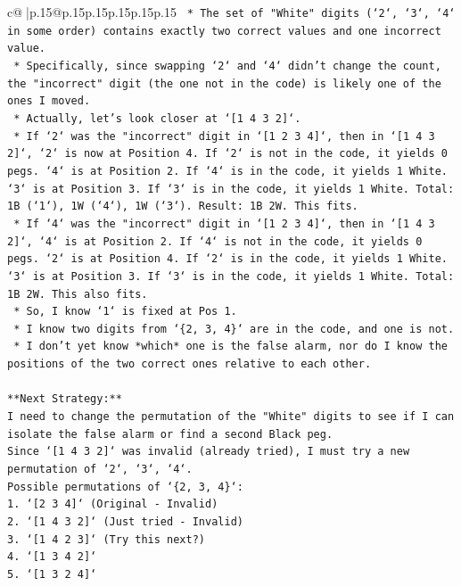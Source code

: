 \documentclass{article}
\begin{document}
{\begin{supertabular}{c@{$\;$}|p{.15\linewidth}@{}p{.15\linewidth}p{.15\linewidth}p{.15\linewidth}p{.15\linewidth}p{.15\linewidth}}
{{{\texttt{        *   The set of "White" digits (`2`, `3`, `4` in some order) contains exactly two correct values and one incorrect value.} \\
\texttt{        *   Specifically, since swapping `2` and `4` didn't change the count, the "incorrect" digit (the one not in the code) is likely one of the ones I moved.} \\
\texttt{    *   Actually, let's look closer at `{[}1 4 3 2{]}`.} \\
\texttt{        *   If `2` was the "incorrect" digit in `{[}1 2 3 4{]}`, then in `{[}1 4 3 2{]}`, `2` is now at Position 4. If `2` is not in the code, it yields 0 pegs. `4` is at Position 2. If `4` is in the code, it yields 1 White. `3` is at Position 3. If `3` is in the code, it yields 1 White. Total: 1B (`1`), 1W (`4`), 1W (`3`). Result: 1B 2W. This fits.} \\
\texttt{        *   If `4` was the "incorrect" digit in `{[}1 2 3 4{]}`, then in `{[}1 4 3 2{]}`, `4` is at Position 2. If `4` is not in the code, it yields 0 pegs. `2` is at Position 4. If `2` is in the code, it yields 1 White. `3` is at Position 3. If `3` is in the code, it yields 1 White. Total: 1B 2W. This also fits.} \\
\texttt{    *   So, I know `1` is fixed at Pos 1.} \\
\texttt{    *   I know two digits from `\{2, 3, 4\}` are in the code, and one is not.} \\
\texttt{    *   I don't yet know *which* one is the false alarm, nor do I know the positions of the two correct ones relative to each other.} \\
\\ 
\texttt{**Next Strategy:**} \\
\texttt{I need to change the permutation of the "White" digits to see if I can isolate the false alarm or find a second Black peg.} \\
\texttt{Since `{[}1 4 3 2{]}` was invalid (already tried), I must try a new permutation of `2`, `3`, `4`.} \\
\texttt{Possible permutations of `\{2, 3, 4\}`:} \\
\texttt{1.  `{[}2 3 4{]}` (Original {-} Invalid)} \\
\texttt{2.  `{[}1 4 3 2{]}` (Just tried {-} Invalid)} \\
\texttt{3.  `{[}1 4 2 3{]}` (Try this next?)} \\
\texttt{4.  `{[}1 3 4 2{]}`} \\
\texttt{5.  `{[}1 3 2 4{]}`} \\
}}}
\end{supertabular}}
\end{document}
